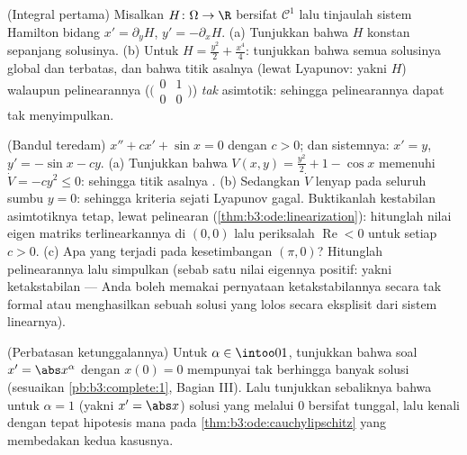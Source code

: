 \begin{exercise}[$\star\star$]\label{exo:b3:ode:7}
(Integral pertama) Misalkan $H \colon \Omega \to \R$ bersifat $\mathcal
C^1$ lalu tinjaulah sistem Hamilton bidang $x' =
\partial_yH$, $y' = -\partial_xH$.
(a) Tunjukkan bahwa $H$ konstan sepanjang solusinya.
(b) Untuk $H = \frac{y^2}2 + \frac{x^4}4$: tunjukkan bahwa semua solusinya
global dan terbatas, dan bahwa titik asalnya 
(lewat Lyapunov: yakni $H$) walaupun pelinearannya
($\bigl(\begin{smallmatrix}0&1\\0&0\end{smallmatrix}\bigr)$)
\emph{tak}  asimtotik: sehingga pelinearannya dapat tak menyimpulkan.
\end{exercise}

\begin{exercise}[$\star\star\star$]\label{exo:b3:ode:8}
(Bandul teredam) $x'' + cx' + \sin x = 0$ dengan $c > 0$; dan sistemnya:
$x' = y$, $y' = -\sin x - cy$.
(a) Tunjukkan bahwa $V(x, y) = \frac{y^2}2 + 1 - \cos x$ memenuhi $\dot
V = -cy^2 \leq 0$: sehingga titik asalnya .
(b) Sedangkan $\dot V$ lenyap pada seluruh sumbu $y = 0$: sehingga kriteria
sejati Lyapunov gagal. Buktikanlah kestabilan asimtotiknya tetap,
lewat pelinearan (\cref{thm:b3:ode:linearization}): hitunglah
nilai eigen matriks terlinearkannya di $(0,0)$ lalu periksalah
$\operatorname{Re} < 0$ untuk setiap $c > 0$.
(c) Apa yang terjadi pada kesetimbangan $(\pi, 0)$? Hitunglah
pelinearannya lalu simpulkan (sebab satu nilai eigennya positif:
yakni ketakstabilan --- Anda boleh memakai pernyataan ketakstabilannya
secara tak formal atau menghasilkan sebuah solusi yang lolos secara eksplisit dari
sistem linearnya).
\end{exercise}

\begin{exercise}[$\star\star$]\label{exo:b3:ode:9}
(Perbatasan ketunggalannya) Untuk $\alpha \in \intoo01$, tunjukkan bahwa
soal $x' = \abs x^{\alpha}$ dengan $x(0) = 0$ mempunyai tak berhingga
banyak solusi (sesuaikan \cref{pb:b3:complete:1}, Bagian III).
Lalu tunjukkan sebaliknya bahwa untuk $\alpha = 1$ (yakni $x' = \abs
x$) solusi yang melalui $0$ bersifat tunggal, lalu kenali
dengan tepat hipotesis mana pada
\cref{thm:b3:ode:cauchylipschitz} yang membedakan kedua
kasusnya.
\end{exercise}

